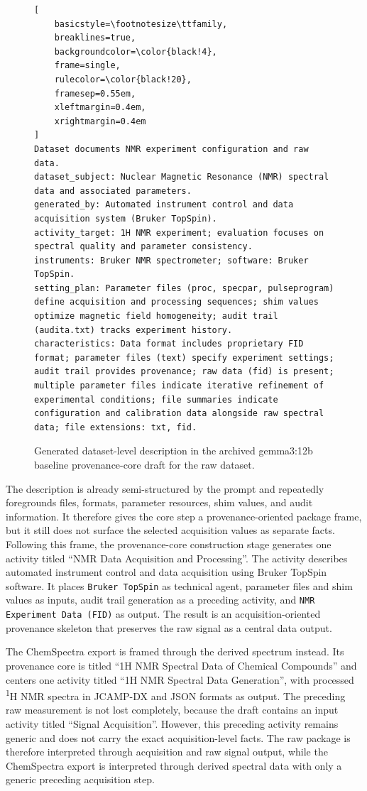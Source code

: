 \begin{figure}[htbp]
\begin{lstlisting}[
    basicstyle=\footnotesize\ttfamily,
    breaklines=true,
    backgroundcolor=\color{black!4},
    frame=single,
    rulecolor=\color{black!20},
    framesep=0.55em,
    xleftmargin=0.4em,
    xrightmargin=0.4em
]
Dataset documents NMR experiment configuration and raw data.
dataset_subject: Nuclear Magnetic Resonance (NMR) spectral data and associated parameters.
generated_by: Automated instrument control and data acquisition system (Bruker TopSpin).
activity_target: 1H NMR experiment; evaluation focuses on spectral quality and parameter consistency.
instruments: Bruker NMR spectrometer; software: Bruker TopSpin.
setting_plan: Parameter files (proc, specpar, pulseprogram) define acquisition and processing sequences; shim values optimize magnetic field homogeneity; audit trail (audita.txt) tracks experiment history.
characteristics: Data format includes proprietary FID format; parameter files (text) specify experiment settings; audit trail provides provenance; raw data (fid) is present; multiple parameter files indicate iterative refinement of experimental conditions; file summaries indicate configuration and calibration data alongside raw spectral data; file extensions: txt, fid.
\end{lstlisting}
    \caption{Generated dataset-level description in the archived gemma3:12b baseline provenance-core draft for the raw dataset.}
    \label{fig:evaluation-raw-core-description}
\end{figure}

The description is already semi-structured by the prompt and repeatedly foregrounds files, formats, parameter resources, shim values, and audit information.
It therefore gives the core step a provenance-oriented package frame, but it still does not surface the selected acquisition values as separate facts.
Following this frame, the provenance-core construction stage generates one activity titled \enquote{NMR Data Acquisition and Processing}.
The activity describes automated instrument control and data acquisition using Bruker TopSpin software.
It places \texttt{Bruker TopSpin} as technical agent, parameter files and shim values as inputs, audit trail generation as a preceding activity, and \texttt{NMR Experiment Data (FID)} as output.
The result is an acquisition-oriented provenance skeleton that preserves the raw signal as a central data output.

The ChemSpectra export is framed through the derived spectrum instead.
Its provenance core is titled \enquote{1H NMR Spectral Data of Chemical Compounds} and centers one activity titled \enquote{1H NMR Spectral Data Generation}, with processed \textsuperscript{1}H \ac{NMR} spectra in \ac{JCAMP-DX} and JSON formats as output.
The preceding raw measurement is not lost completely, because the draft contains an input activity titled \enquote{Signal Acquisition}.
However, this preceding activity remains generic and does not carry the exact acquisition-level facts.
The raw package is therefore interpreted through acquisition and raw signal output, while the ChemSpectra export is interpreted through derived spectral data with only a generic preceding acquisition step.

